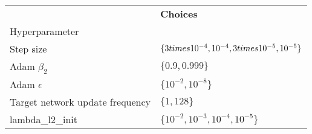 \begin{tabular}{ll}
 & \bfseries Choices \\
Hyperparameter &  \\
Step size & $\{3 \\times 10^{-4}, 10^{-4}, 3 \\times 10^{-5}, 10^{-5}\}$ \\
Adam $\beta_2$ & $\{0.9, 0.999\}$ \\
Adam $\epsilon$ & $\{10^{-2}, 10^{-8}\}$ \\
Target network update frequency & $\{1, 128\}$ \\
lambda_l2_init & $\{10^{-2}, 10^{-3}, 10^{-4}, 10^{-5}\}$ \\
\end{tabular}
